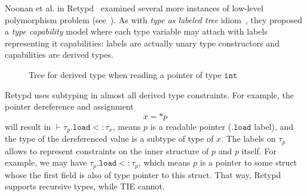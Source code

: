 \documentclass[compsoc,conference,a4paper,10pt,times]{IEEEtran}
\begin{document}
Noonan et al. in Retypd~\cite{noonan_polymorphic_2016} examined several more instances of
low-level polymorphism problem (see~).
As with \emph{type as labeled tree} idiom~\cite{kozen_efficient_1993}, they proposed a
\emph{type capability} model where each type variable may attach with labels representing it
capabilities: labels are actually unary type constructors and capabilities are derived types.
\begin{figure}[h]
  \centering
  \caption{Tree for derived type when reading a pointer of type $\mathtt{int}$}
  \label{fig:derivedtype}
\end{figure}
Retypd uses subtyping in almost all derived type constraints.
For example, the pointer dereference and assignment
\begin{equation*}
  x = *p
\end{equation*}
will result in $\vdash \tau_{p}.\mathtt{load} <\colon \tau_{x}$, means $p$ is a readable pointer
($\mathtt{.load}$ label), and
the type of the dereferenced value is a subtype of type of $x$. The labels on $\tau_{p}$ allows to
represent constraints on the inner structure of $p$ and $p$ itself. For example,
we may have $\tau_{p}.\mathtt{load} <\colon \tau_{p}$, which means $p$ is a pointer to some struct
whose the first field is also of type pointer to this struct. That way, Retypd
supports recursive types, while TIE cannot.

\end{document}
